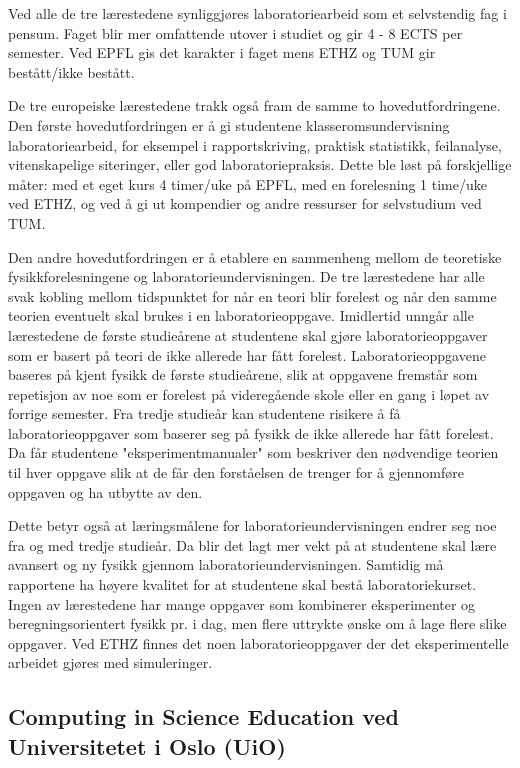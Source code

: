 \documentclass{article}
\begin{document}
Ved alle de tre lærestedene synliggjøres laboratoriearbeid som et selvstendig fag i pensum. Faget blir mer omfattende utover i studiet og gir 4 - 8 ECTS per semester. Ved EPFL gis det karakter i faget mens ETHZ og TUM gir bestått/ikke bestått.  

De tre europeiske lærestedene trakk også fram de samme to hovedutfordringene. Den første hovedutfordringen er å gi studentene klasseromsundervisning laboratoriearbeid, for eksempel i rapportskriving, praktisk statistikk, feilanalyse, vitenskapelige siteringer, eller god laboratoriepraksis. Dette ble løst på forskjellige måter: med et eget kurs 4 timer/uke på EPFL, med en forelesning 1 time/uke ved ETHZ, og ved å gi ut kompendier og andre ressurser for selvstudium ved TUM.

Den andre hovedutfordringen er å etablere en sammenheng mellom de teoretiske fysikkforelesningene og laboratorieundervisningen. De tre lærestedene har alle svak kobling mellom tidspunktet for når en teori blir forelest og når den samme teorien eventuelt skal brukes i en laboratorieoppgave. Imidlertid unngår alle lærestedene de første studieårene at studentene skal gjøre laboratorieoppgaver som er basert på teori de ikke allerede har fått forelest. Laboratorieoppgavene baseres på kjent fysikk de første studieårene, slik at oppgavene fremstår som repetisjon av noe som er forelest på videregående skole eller en gang i løpet av forrige semester. Fra tredje studieår kan studentene risikere å få laboratorieoppgaver som baserer seg på fysikk de ikke allerede har fått forelest. Da får studentene "eksperimentmanualer" som beskriver den nødvendige teorien til hver oppgave slik at de får den forståelsen de trenger for å gjennomføre oppgaven og ha utbytte av den. 

Dette betyr også at læringsmålene for laboratorieundervisningen endrer seg noe fra og med tredje studieår. Da blir det lagt mer vekt på at studentene skal lære avansert og ny fysikk gjennom laboratorieundervisningen. Samtidig må rapportene ha høyere kvalitet for at studentene skal bestå laboratoriekurset. Ingen av lærestedene har mange oppgaver som kombinerer eksperimenter og beregningsorientert fysikk pr. i dag, men flere uttrykte ønske om å lage flere slike oppgaver. Ved ETHZ finnes det noen laboratorieoppgaver der det eksperimentelle arbeidet gjøres med simuleringer.

\subsection{Computing in Science Education ved Universitetet i Oslo (UiO)} 
\end{document}
